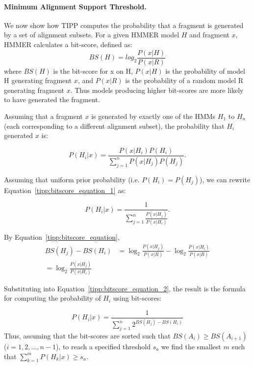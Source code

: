 \paragraph{Minimum Alignment Support Threshold. }
We now show how 
TIPP computes the probability that a fragment is
generated by a set of alignment subsets.
For a given HMMER model $H$ and fragment $x$, HMMER calculates a bit-score, defined as:
\begin{equation}
BS(H) = log_2 \frac{P(x|H)}{P(x|R)} \label{tipp:bitscore_equation}
\end{equation}
\noindent where $BS(H)$ is the bit-score for x on H, $P(x|H)$ 
is the probability of model H generating fragment $x$, and $P(x|R)$ is the probability of a random model R generating fragment $x$.
Thus models producing higher bit-scores are more likely to have generated the fragment. 


Assuming that a fragment $x$ is generated by 
exactly one  of the  HMMs $H_1$ to $H_n$ (each corresponding to a different alignment subset),
the probability that $H_i$ generated $x$ is:

\begin{equation}
P(H_i|x) = \frac{P(x|H_i)P(H_i)}{\sum_{j=1}^{n} P(x|H_j)P(H_j)}.\label{tipp:bitscore_equation_1}
\end{equation}

Assuming that uniform prior probability 
(i.e. $P(H_i)=P(H_j)$),
we can rewrite Equation~\ref{tipp:bitscore_equation_1} as:

\begin{equation}
P(H_i|x) = \frac{1}{\sum_{j=1}^{n} \frac{P(x|H_j)}{P(x|H_i)}}.\label{tipp:bitscore_equation_2}
\end{equation}

By Equation~\ref{tipp:bitscore_equation}, %
 \begin{align}
{BS(H_j) - BS(H_i)}&= {\log_2 \frac{P(x|H_j)}{P(x|R)} - \log_2 \frac{P(x|H_i)}{P(x|R)}} \\=  \log_2\frac{P(x|H_j)}{P(x|H_i)}\label{tipp:bitscore_equation_4}
\end{align}

Substituting into Equation~\ref{tipp:bitscore_equation_2}, 
the result is the formula for computing the probability of $H_i$ using bit-scores:

\begin{equation}
P(H_i|x) = \frac{1}{\sum_{j=1}^{n} 2^{BS(H_j)-BS(H_i)}}
\end{equation}\label{tipp:bitscore_equation_5}
\noindent
Thus, 
assuming that the bit-scores are sorted such 
that $BS(A_i) \geq BS(A_{i+1})$ ($i=1,2,\ldots,n-1$), 
to reach a specified threshold $s_a$ we find the
smallest $m$ such that ${\sum_{k=1}^{m} P(H_k|x)} \geq s_a$.

